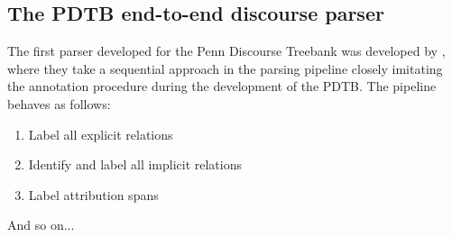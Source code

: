 \subsection{The PDTB end-to-end discourse parser}

The first parser developed for the Penn Discourse Treebank was developed by \citep{lin_pdtbstyled_2014}, where they take a sequential approach in the parsing pipeline closely imitating the annotation procedure during the development of the PDTB. The pipeline behaves as follows:

\begin{enumerate}
    \item Label all explicit relations
    \item Identify and label all implicit relations
    \item Label attribution spans
\end{enumerate}

And so on...
